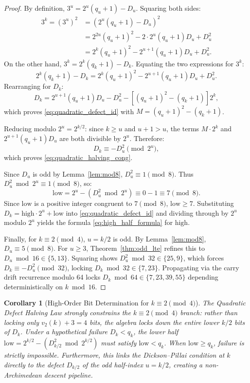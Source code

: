 \documentclass[11pt,reqno]{amsart}
\newtheorem{corollary}[theorem]{Corollary}
\theoremstyle{definition}
\numberwithin{equation}{section}
\begin{document}
\begin{proof}
By definition, $3^u = 2^u (q_u + 1) - D_u$. Squaring both sides:
\begin{align*}
3^k = (3^u)^2 &= \left( 2^u (q_u + 1) - D_u \right)^2 \\
&= 2^{2u}(q_u + 1)^2 - 2 \cdot 2^u(q_u + 1) D_u + D_u^2 \\
&= 2^k(q_u + 1)^2 - 2^{u+1}(q_u + 1) D_u + D_u^2.
\end{align*}
On the other hand, $3^k = 2^k(q_k + 1) - D_k$. Equating the two expressions for $3^k$:
\[
2^k(q_k + 1) - D_k = 2^k(q_u + 1)^2 - 2^{u+1}(q_u + 1) D_u + D_u^2.
\]
Rearranging for $D_k$:
\[
D_k = 2^{u+1}(q_u + 1) D_u - D_u^2 - \left[ (q_u + 1)^2 - (q_k + 1) \right] 2^k,
\]
which proves \eqref{eq:quadratic_defect_id} with $M = (q_u + 1)^2 - (q_k + 1)$.

Reducing modulo $2^u = 2^{k/2}$: since $k \ge u$ and $u + 1 > u$, the terms $M \cdot 2^k$ and $2^{u+1}(q_u + 1) D_u$ are both divisible by $2^u$. Therefore:
\[
D_k \equiv -D_u^2 \pmod{2^u},
\]
which proves \eqref{eq:quadratic_halving_cong}.

Since $D_u$ is odd by Lemma~\ref{lem:mod8}, $D_u^2 \equiv 1 \pmod 8$. Thus $D_u^2 \bmod 2^u \equiv 1 \pmod 8$, so:
\[
\mathrm{low} = 2^u - (D_u^2 \bmod 2^u) \equiv 0 - 1 \equiv 7 \pmod 8.
\]
Since $\mathrm{low}$ is a positive integer congruent to $7 \pmod 8$, $\mathrm{low} \ge 7$.
Substituting $D_k = \mathrm{high} \cdot 2^u + \mathrm{low}$ into \eqref{eq:quadratic_defect_id} and dividing through by $2^u$ modulo $2^u$ yields the formula \eqref{eq:high_half_formula} for $\mathrm{high}$.

Finally, for $k \equiv 2 \pmod 4$, $u = k/2$ is odd. By Lemma~\ref{lem:mod8}, $D_u \equiv 5 \pmod 8$. For $u \ge 3$, Theorem~\ref{thm:odd_lte} refines this to $D_u \bmod 16 \in \{5, 13\}$. Squaring shows $D_u^2 \bmod 32 \in \{25, 9\}$, which forces $D_k \equiv -D_u^2 \pmod{32}$, locking $D_k \bmod 32 \in \{7, 23\}$. Propagating via the carry drift recurrence modulo 64 locks $D_k \bmod 64 \in \{7, 23, 39, 55\}$ depending deterministically on $k \bmod 16$. \qedhere
\end{proof}

\begin{corollary}[High-Order Bit Determination for $k \equiv 2 \pmod 4$]\label{cor:quadratic_barrier}
The Quadratic Defect Halving Law strongly constrains the $k \equiv 2 \pmod 4$ branch:
rather than locking only $v_2(k) + 3 = 4$ bits, the algebra locks down the entire lower $k/2$ bits of $D_k$.
Under a hypothetical failure $D_k < q_k$, the lower half $\mathrm{low} = 2^{k/2} - (D_{k/2}^2 \bmod 2^{k/2})$ must satisfy $\mathrm{low} < q_k$.
When $\mathrm{low} \ge q_k$, failure is strictly impossible.
Furthermore, this links the Dickson--Pillai condition at $k$ directly to the defect $D_{k/2}$ of the odd half-index $u = k/2$, creating a non-Archimedean descent pipeline.
\end{corollary}
\end{document}
